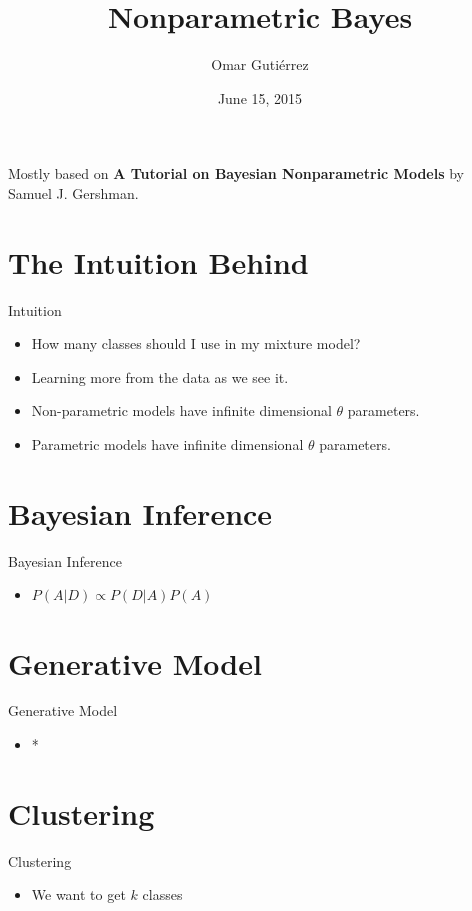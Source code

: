 \documentclass[handout]{beamer}
\title[lkjl\insertdate]{Nonparametric Bayes}
\author{Omar Guti\'errez}
\institute{@omar}
\date{June 15, 2015}
\begin{document}
\begin{frame}
\titlepage
Mostly based on \textbf{A Tutorial on Bayesian Nonparametric Models} by Samuel J. Gershman.
\end{frame}

\section{The Intuition Behind}
\begin{frame}{Intuition}
\begin{itemize}
\item How many classes should I use in my mixture model?
\item Learning more from the data as we see it.
\item Non-parametric models have infinite dimensional $\theta$ parameters.
\item Parametric models have infinite dimensional $\theta$ parameters.
\end{itemize}
\end{frame}

\section{Bayesian Inference}
\begin{frame}{Bayesian Inference}
	\begin{itemize}
	\item $P(A|D) \propto P(D|A) P(A)$
	\end{itemize}
\end{frame}

\section{Generative Model}
\begin{frame}{Generative Model}
	\begin{itemize}
	\item *
	\end{itemize}
\end{frame}

\section{Clustering}
\begin{frame}{Clustering}
	\begin{itemize}
	\item We want to get $k$ classes
	\end{itemize}
\end{frame}
\end{document}
